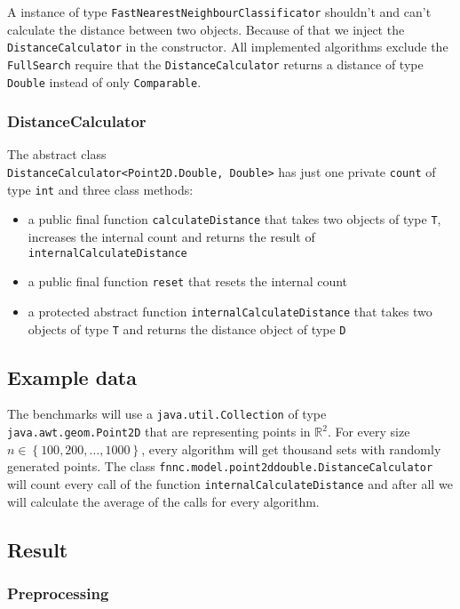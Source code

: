 \documentclass[runningheads,a4paper]{llncs}
\begin{document}
A instance of type \verb+FastNearestNeighbourClassificator+ shouldn't and can't calculate the distance between two
objects. Because of that we inject the \verb+DistanceCalculator+ in the constructor. All implemented algorithms exclude
the \verb+FullSearch+ require that the \verb+DistanceCalculator+ returns a distance of type \verb+Double+ instead of
only \verb+Comparable+.

\subsubsection{DistanceCalculator}

The abstract class\\ \verb+DistanceCalculator<Point2D.Double, Double>+ has just one private \verb+count+ of type
\verb+int+ and three class methods:
\begin{itemize}
	\item a public final function \verb+calculateDistance+ that takes two objects of type \verb+T+, increases the
		internal count and returns the result of \verb+internalCalculateDistance+
	\item a public final function \verb+reset+ that resets the internal count
	\item a protected abstract function \verb+internalCalculateDistance+ that takes two objects of type \verb+T+ and
		returns the distance object of type \verb+D+
\end{itemize}

\subsection{Example data}

The benchmarks will use a \verb+java.util.Collection+ of type\\ \verb+java.awt.geom.Point2D+ that are representing
points in $\mathbb{R}^2$. For every size $n \in \left\{ {100, 200, \dots, 1000}\right\}$, every algorithm will get
thousand sets with randomly generated points. The class \verb+fnnc.model.point2ddouble.DistanceCalculator+ will count
every call of the function \verb+internalCalculateDistance+ and after all we will calculate the average of the calls for
every algorithm.

\subsection{Result}

\subsubsection{Preprocessing}
\end{document}
